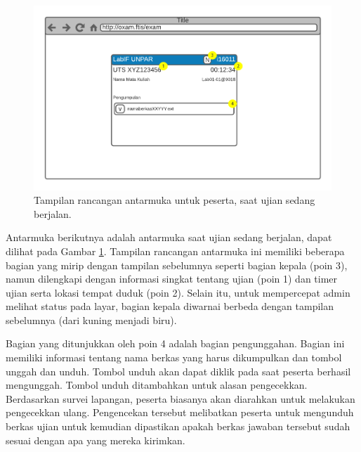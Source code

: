     \begin{figure}
        \centering
        \includegraphics[width=0.7\paperwidth]{Gambar/mockups/Mockup--Peserta - Startstate.pdf}
        \caption{Tampilan rancangan antarmuka untuk peserta, saat ujian sedang berjalan.}
        \label{fig:mockup_peserta_activestate}
    \end{figure}
    Antarmuka berikutnya adalah antarmuka saat ujian sedang berjalan, dapat dilihat pada Gambar 
    \ref{fig:mockup_peserta_activestate}. Tampilan rancangan antarmuka ini memiliki beberapa bagian
    yang mirip dengan tampilan sebelumnya seperti bagian kepala (poin 3), namun dilengkapi dengan
    informasi singkat tentang ujian (poin 1) dan timer ujian serta lokasi tempat duduk (poin 2).
    Selain itu, untuk mempercepat admin melihat status pada layar, bagian kepala diwarnai berbeda
    dengan tampilan sebelumnya (dari kuning menjadi biru).
    
    Bagian yang ditunjukkan oleh poin 4 adalah bagian pengunggahan. Bagian ini memiliki informasi
    tentang nama berkas yang harus dikumpulkan dan tombol unggah dan unduh. Tombol unduh akan dapat
    diklik pada saat peserta berhasil mengunggah. Tombol unduh ditambahkan untuk alasan pengecekkan.
    Berdasarkan survei lapangan, peserta biasanya akan diarahkan untuk melakukan pengecekkan ulang.
    Pengencekan tersebut melibatkan peserta untuk mengunduh berkas ujian untuk kemudian dipastikan
    apakah berkas jawaban tersebut sudah sesuai dengan apa yang mereka kirimkan.
    

